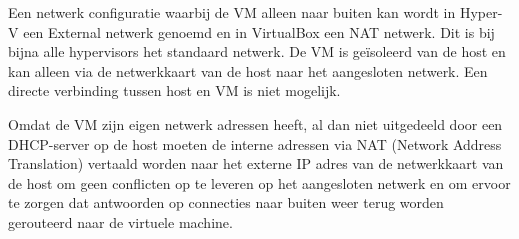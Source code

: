Een netwerk configuratie waarbij de VM alleen naar buiten kan wordt in Hyper-V een External netwerk genoemd en in VirtualBox een NAT netwerk. Dit is bij bijna alle hypervisors het standaard netwerk. De VM is ge\"isoleerd van de host en kan alleen via de netwerkkaart van de host naar het aangesloten netwerk. Een directe verbinding tussen host en VM is niet mogelijk.

Omdat de VM zijn eigen netwerk adressen heeft, al dan niet uitgedeeld door een DHCP-server op de host moeten de interne adressen via NAT (Network Address Translation) vertaald worden naar het externe IP adres van de netwerkkaart van de host om geen conflicten op te leveren op het aangesloten netwerk en om ervoor te zorgen dat antwoorden op connecties naar buiten weer terug worden gerouteerd naar de virtuele machine.
